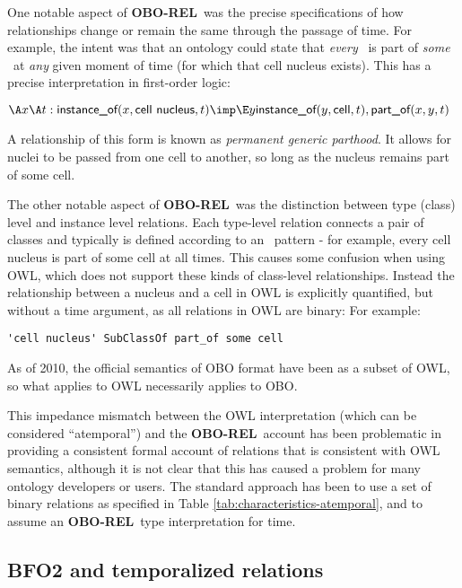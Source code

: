 \documentclass{bioinfo}
\def\partOf{\pr{part\_of}}
\def\instanceOf{\pr{instance\_of}}
\def\CellNucleus{\pr{cell nucleus}}
\def\Cell{\pr{cell}}
\def\OBOREL{\textbf{OBO-REL}}
\begin{document}
One notable aspect of \OBOREL\ was the precise specifications of how
relationships change or remain the same through the passage of
time. For example, the intent was that an ontology could state that
\emph{every} \CellNucleus\ is part of \emph{some} \Cell\ at \emph{any}
given moment of time (for which that cell nucleus exists). This has a
precise interpretation in first-order logic:

$
\A x \A t : \instanceOf(x, \CellNucleus, t) \imp \\
 \E y \instanceOf(y, \Cell, t), \partOf(x,y,t)
$

A relationship of this form is known as \emph{permanent generic
  parthood}. It allows for nuclei to be passed from one cell to
another, so long as the nucleus remains part of some cell.

The other notable aspect of \OBOREL\ was the distinction between type
(class) level and instance level relations. Each type-level relation
connects a pair of classes and typically is defined according to an
\ pattern - for example, every cell nucleus is
part of some cell at all times. This causes some confusion when using
OWL, which does not support these kinds of class-level
relationships. Instead the relationship between a nucleus and a cell
in OWL is explicitly quantified, but without a time argument, as all
relations in OWL are binary: For example:

\begin{verbatim}
'cell nucleus' SubClassOf part_of some cell
\end{verbatim}

As of 2010, the official semantics of OBO format
have been as a subset of OWL, so what applies to OWL necessarily
applies to OBO.

This impedance mismatch between the OWL interpretation (which can be
considered ``atemporal'') and the \OBOREL\ account has been
problematic in providing a consistent formal account of relations that
is consistent with OWL semantics, although it is not clear that this
has caused a problem for many ontology developers or users. The
standard approach has been to use a set of binary relations as
specified in Table \ref{tab:characteristics-atemporal}, and to assume
an \OBOREL\ type interpretation for time.

\subsection{BFO2 and temporalized relations}
\end{document}

